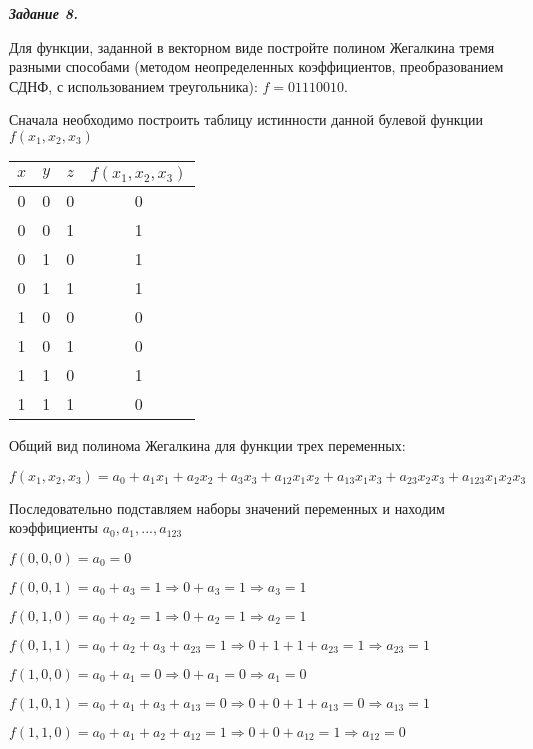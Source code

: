 \documentclass[11pt]{article}
\begin{document}
\textit{\textbf{Задание 8.}}

Для функции, заданной в векторном виде постройте полином 
Жегалкина тремя разными способами (методом неопределенных 
коэффициентов, преобразованием СДНФ, с использованием треугольника): 
$f=01110010$.

Сначала необходимо построить таблицу истинности данной булевой
функции $f(x_1,x_2,x_3)$

\begin{center}
        \begin{tabular}{ |c|c|c|c| }
                \hline
				$x$ & $y$ & $z$ & $f(x_1,x_2,x_3)$\\
                \hline
				0 & 0 & 0 & 0\\
                \hline
				0 & 0 & 1 & 1\\
                \hline
				0 & 1 & 0 & 1\\
                \hline
				0 & 1 & 1 & 1\\
                \hline
				1 & 0 & 0 & 0\\
                \hline
				1 & 0 & 1 & 0\\
                \hline
                1 & 1 & 0 & 1\\
                \hline
                1 & 1 & 1 & 0\\
                \hline
        \end{tabular}
\end{center}

Общий вид полинома Жегалкина для функции трех переменных:

$$f(x_1,x_2,x_3)=a_0+a_1x_1+a_2x_2+a_3x_3+a_{12}x_1x_2+a_{13}x_1x_3+a_{23}x_2x_3+a_{123}x_1x_2x_3$$

Последовательно подставляем наборы значений переменных и находим
коэффициенты $a_0,a_1,...,a_{123}$

$f(0,0,0)=a_0=0$

$f(0,0,1)=a_0 + a_3=1 \Rightarrow 0 + a_3 = 1 \Rightarrow a_3 = 1$

$f(0,1,0)=a_0 + a_2=1 \Rightarrow 0 + a_2 = 1 \Rightarrow a_2=1$

$f(0,1,1)=a_0 + a_2 + a_3 + a_{23}=1 \Rightarrow 0 + 1 + 1 + a_{23}=1 \Rightarrow a_{23} = 1$

$f(1,0,0)=a_0 + a_1=0 \Rightarrow 0 + a_1=0 \Rightarrow a_1 = 0$

$f(1,0,1)=a_0 + a_1 + a_3 + a_{13}=0 \Rightarrow 0 + 0 + 1 + a_{13}=0 \Rightarrow a_{13}=1$

$f(1,1,0)=a_0 + a_1 + a_2 + a_{12}=1 \Rightarrow 0 + 0 + a_{12}=1 \Rightarrow a_{12}=0$
\end{document}

